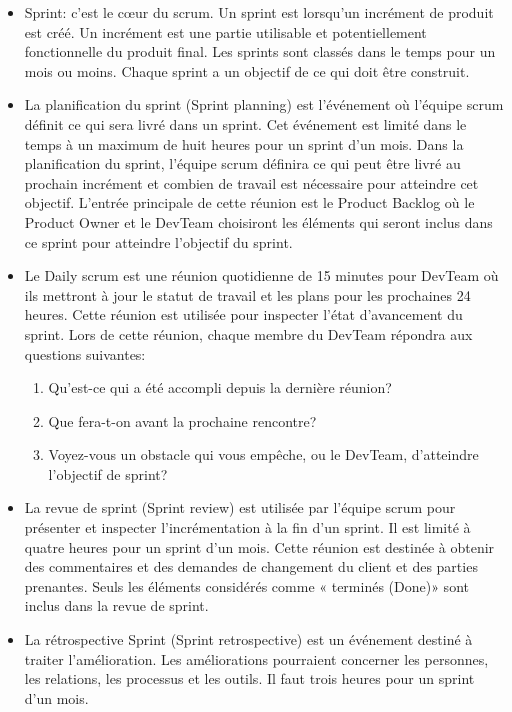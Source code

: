 \begin{itemize}[label=$\square$,leftmargin=* ,parsep=0cm,itemsep=0cm,topsep=0cm]
	\item \textsf{Sprint:} c’est le cœur du scrum. Un sprint est lorsqu’un incrément de produit est créé. Un incrément est une partie utilisable et potentiellement fonctionnelle du produit final. Les sprints sont classés dans le temps pour un mois ou moins. Chaque sprint a un objectif de ce qui doit être construit. 
	\item \textsf{La planification du sprint (Sprint planning)} est l’événement où l’équipe scrum définit ce qui sera livré dans un sprint. Cet événement est limité dans le temps à un maximum de huit heures pour un sprint d’un mois. Dans la planification du sprint, l’équipe scrum définira ce qui peut être livré au prochain incrément et combien de travail est nécessaire pour atteindre cet objectif. L’entrée principale de cette réunion est le Product Backlog où le Product Owner et le DevTeam choisiront les éléments qui seront inclus dans ce sprint pour atteindre l’objectif du sprint. 
	\item \textsf{Le Daily scrum} est une réunion quotidienne de 15 minutes pour DevTeam où ils mettront à jour le statut de travail et les plans pour les prochaines 24 heures. Cette réunion est utilisée pour inspecter l’état d’avancement du sprint. Lors de cette réunion, chaque membre du DevTeam répondra aux questions suivantes:
	\begin{enumerate}
		\item Qu’est-ce qui a été accompli depuis la dernière réunion?
		\item Que fera-t-on avant la prochaine rencontre?
		\item Voyez-vous un obstacle qui vous empêche, ou le DevTeam, d’atteindre l’objectif de sprint?
	\end{enumerate}
	\item \textsf{La revue de sprint (Sprint review)} est utilisée par l’équipe scrum pour présenter et inspecter l’incrémentation à la fin d’un sprint. Il est limité à quatre heures pour un sprint d’un mois. Cette réunion est destinée à obtenir des commentaires et des demandes de changement du client et des parties prenantes. Seuls les éléments considérés comme « terminés (Done)» sont inclus dans la revue de sprint. 
	\item \textsf{La rétrospective Sprint (Sprint retrospective)} est un événement destiné à traiter l’amélioration. Les améliorations pourraient concerner les personnes, les relations, les processus et les outils. Il faut trois heures pour un sprint d’un mois. 
\end{itemize}

